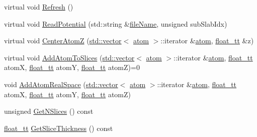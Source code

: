 \begin{DoxyCompactItemize}
\item 
virtual void \hyperlink{class_q_s_t_e_m_1_1_c_potential_a377f6971483c0fb647cc37eed3c0e6bf}{Refresh} ()
\item 
virtual void \hyperlink{class_q_s_t_e_m_1_1_c_potential_aa50c82d9fb190d5782d483b1dd441176}{Read\-Potential} (std\-::string \&\hyperlink{qmb_8m_a7a230f02bdffebd1357e3c0b49e01271}{file\-Name}, unsigned sub\-Slab\-Idx)
\item 
virtual void \hyperlink{class_q_s_t_e_m_1_1_c_potential_a207db8cc69e2d4837c61507cdf59241c}{Center\-Atom\-Z} (\hyperlink{qmb_8m_af54b69a32590de218622e869b06b47b3}{std\-::vector}$<$ \hyperlink{namespace_q_s_t_e_m_a402dabc31a7a1fe906d0cdd138c69686}{atom} $>$\-::iterator \&\hyperlink{namespace_q_s_t_e_m_a402dabc31a7a1fe906d0cdd138c69686}{atom}, \hyperlink{namespace_q_s_t_e_m_a915d7caa497280d9f927c4ce8d330e47}{float\-\_\-tt} \&z)
\item 
virtual void \hyperlink{class_q_s_t_e_m_1_1_c_potential_a4e5f7f86bf4f96a6408c362d598f19f7}{Add\-Atom\-To\-Slices} (\hyperlink{qmb_8m_af54b69a32590de218622e869b06b47b3}{std\-::vector}$<$ \hyperlink{namespace_q_s_t_e_m_a402dabc31a7a1fe906d0cdd138c69686}{atom} $>$\-::iterator \&\hyperlink{namespace_q_s_t_e_m_a402dabc31a7a1fe906d0cdd138c69686}{atom}, \hyperlink{namespace_q_s_t_e_m_a915d7caa497280d9f927c4ce8d330e47}{float\-\_\-tt} atom\-X, \hyperlink{namespace_q_s_t_e_m_a915d7caa497280d9f927c4ce8d330e47}{float\-\_\-tt} atom\-Y, \hyperlink{namespace_q_s_t_e_m_a915d7caa497280d9f927c4ce8d330e47}{float\-\_\-tt} atom\-Z)=0
\item 
void \hyperlink{class_q_s_t_e_m_1_1_c_potential_ac3aa2b1121cc9b6e6d43793db8ea58d8}{Add\-Atom\-Real\-Space} (\hyperlink{qmb_8m_af54b69a32590de218622e869b06b47b3}{std\-::vector}$<$ \hyperlink{namespace_q_s_t_e_m_a402dabc31a7a1fe906d0cdd138c69686}{atom} $>$\-::iterator \&\hyperlink{namespace_q_s_t_e_m_a402dabc31a7a1fe906d0cdd138c69686}{atom}, \hyperlink{namespace_q_s_t_e_m_a915d7caa497280d9f927c4ce8d330e47}{float\-\_\-tt} atom\-X, \hyperlink{namespace_q_s_t_e_m_a915d7caa497280d9f927c4ce8d330e47}{float\-\_\-tt} atom\-Y, \hyperlink{namespace_q_s_t_e_m_a915d7caa497280d9f927c4ce8d330e47}{float\-\_\-tt} atom\-Z)
\item 
unsigned \hyperlink{class_q_s_t_e_m_1_1_c_potential_ab0d42adabf429cc1ccd9758a342e0068}{Get\-N\-Slices} () const 
\item 
\hyperlink{namespace_q_s_t_e_m_a915d7caa497280d9f927c4ce8d330e47}{float\-\_\-tt} \hyperlink{class_q_s_t_e_m_1_1_c_potential_a71eb899bbc8db10572f0e5fcf4ff4734}{Get\-Slice\-Thickness} () const 

\end{DoxyCompactItemize}

